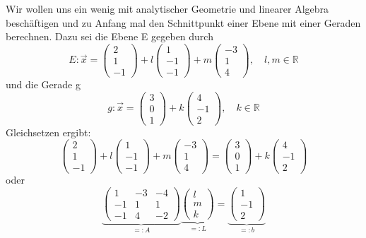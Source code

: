 \documentclass[fontsize=12pt,paper=a4,twoside,bibtotoc,idxtotoc,
liststotoc,pagesize,BCOR1.2cm,DIV15,chapterprefix,pagesize=pdftex]{scrbook}
\theoremstyle{plain}
\theoremstyle{definition}
\theoremstyle{remark}
\begin{document}
Wir wollen uns ein wenig mit analytischer Geometrie und linearer Algebra beschäftigen und zu Anfang mal den Schnittpunkt einer Ebene mit einer Geraden 
berechnen. Dazu sei die Ebene E gegeben durch
\[ E: \vec{x}= 
\left ( \begin{array}{c}  2 \\ 1 \\ -1 \end{array} \right) +l 
\left ( \begin{array}{c}  1 \\ -1 \\ -1 \end{array} \right) +m
\left ( \begin{array}{c}  -3 \\ 1 \\ 4 \end{array} \right), \quad l,m
\in \mathbb{R}
\]
und die Gerade g
\[
g: \vec{x}=
\left ( \begin{array}{c}  3 \\ 0 \\ 1 \end{array} \right) +k
\left ( \begin{array}{c}  4 \\ -1 \\ 2 \end{array} \right), \quad k \in \mathbb{R}
\]
Gleichsetzen ergibt: 
\[ 
\left ( \begin{array}{c}  2 \\ 1 \\ -1 \end{array} \right) +l 
\left ( \begin{array}{c}  1 \\ -1 \\ -1 \end{array} \right) +m
\left ( \begin{array}{c}  -3 \\ 1 \\ 4 \end{array} \right) = \left ( \begin{array}{c}  3 \\ 0 \\ 1 \end{array} \right) +k
\left ( \begin{array}{c}  4 \\ -1 \\ 2 \end{array} \right)
\] oder {
\[ 
\underbrace{\left(   
\begin{array} {ccc} 
1 & -3 & -4\\
-1 & 1 & 1 \\
-1 & 4 & -2  
\end{array} \right)}_{\displaystyle =:A} 
\underbrace{\left ( \begin{array}{c}  l \\ m \\ k \end{array}
  \right)}_{\displaystyle =:L} = \underbrace{\left ( \begin{array}{c}  1 \\ -1 \\ 2
  \end{array} \right)}_{\displaystyle =:b}
\] }
\end{document}
